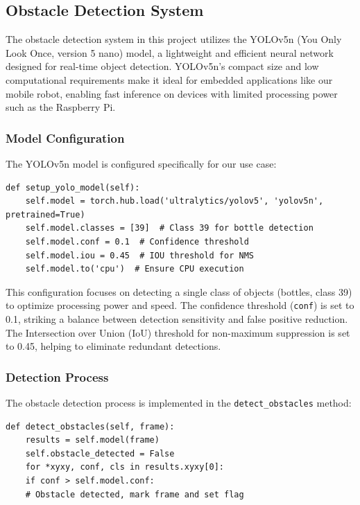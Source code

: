 \subsection{Obstacle Detection System}

The obstacle detection system in this project utilizes the YOLOv5n (You Only Look Once, version 5 nano) model, a lightweight and efficient neural network designed for real-time object detection. YOLOv5n's compact size and low computational requirements make it ideal for embedded applications like our mobile robot, enabling fast inference on devices with limited processing power such as the Raspberry Pi.

\subsubsection{Model Configuration}

The YOLOv5n model is configured specifically for our use case:

\begin{lstlisting}[style=pythonstyle, caption=YOLOv5n cofiguration]
	def setup_yolo_model(self):
	self.model = torch.hub.load('ultralytics/yolov5', 'yolov5n', pretrained=True)
	self.model.classes = [39]  # Class 39 for bottle detection
	self.model.conf = 0.1  # Confidence threshold
	self.model.iou = 0.45  # IOU threshold for NMS
	self.model.to('cpu')  # Ensure CPU execution
\end{lstlisting}

This configuration focuses on detecting a single class of objects (bottles, class 39) to optimize processing power and speed. The confidence threshold (\texttt{conf}) is set to 0.1, striking a balance between detection sensitivity and false positive reduction. The Intersection over Union (IoU) threshold for non-maximum suppression is set to 0.45, helping to eliminate redundant detections.

\subsubsection{Detection Process}

The obstacle detection process is implemented in the \texttt{detect\_obstacles} method:

\begin{lstlisting}[style=pythonstyle, caption=YOLOv5n detection Process]
	def detect_obstacles(self, frame):
	results = self.model(frame)
	self.obstacle_detected = False
	for *xyxy, conf, cls in results.xyxy[0]:
	if conf > self.model.conf:
	# Obstacle detected, mark frame and set flag
\end{lstlisting}

